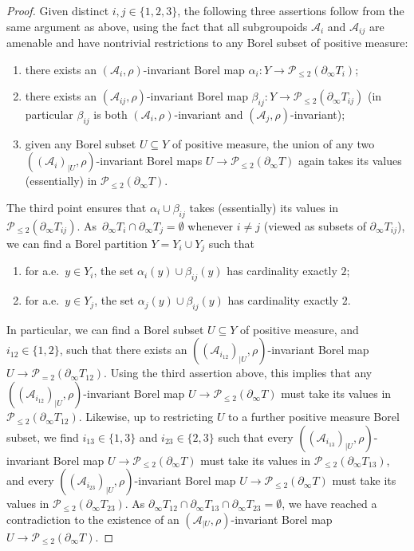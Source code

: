 \documentclass[11pt]{article}
\numberwithin{equation}{section}
\let\mathcal\mathscr
\theoremstyle{plain}
\theoremstyle{definition}
\newcommand{\cala}{\mathcal{A}}
\newcommand{\calp}{\mathcal{P}}
\begin{document}
\begin{proof}
Given distinct $i,j\in\{1,2,3\}$, the following three assertions follow from the same argument as above, using the fact that all subgroupoids $\cala_i$ and $\cala_{ij}$ are amenable and have nontrivial restrictions to any Borel subset of positive measure:
\begin{enumerate}
\item there exists an $(\cala_i,\rho)$-invariant Borel map $\alpha_i:Y\to\calp_{\le 2}(\partial_\infty T_i)$;
\item there exists an $(\cala_{ij},\rho)$-invariant Borel map $\beta_{ij}:Y\to\calp_{\le 2}(\partial_\infty T_{ij})$ (in particular $\beta_{ij}$ is both $(\cala_i,\rho)$-invariant and $(\cala_j,\rho)$-invariant);
\item given any Borel subset $U\subseteq Y$ of positive measure, the union of any two $((\cala_i)_{|U},\rho)$-invariant Borel maps $U\to\calp_{\le 2}(\partial_\infty T)$ again takes its values (essentially) in $\calp_{\le 2}(\partial_\infty T)$.
\end{enumerate}
The third point ensures that $\alpha_i\cup\beta_{ij}$ takes (essentially) its values in $\calp_{\le 2}(\partial_\infty T_{ij})$. As~$\partial_\infty T_i\cap\partial_\infty T_j=\emptyset$ whenever $i\neq j$ (viewed as subsets of $\partial_\infty T_{ij}$), we can find a Borel partition $Y=Y_i\cup Y_j$ such that
\begin{enumerate}
\item for a.e.\ $y\in Y_i$, the set $\alpha_i(y)\cup\beta_{ij}(y)$ has cardinality exactly $2$;
\item for a.e.\ $y\in Y_j$, the set $\alpha_j(y)\cup\beta_{ij}(y)$ has cardinality exactly $2$.
\end{enumerate}
In particular, we can find a Borel subset $U\!\subseteq\! Y$ of positive measure, and $i_{12}\!\in\!\{1,2\}$, such that there exists an $((\cala_{i_{12}})_{|U},\rho)$-invariant Borel map $U\to\calp_{=2}(\partial_\infty T_{12})$. Using the third assertion above, this implies that any $((\cala_{i_{12}})_{|U},\rho)$-invariant Borel map $U\to\calp_{\le 2}(\partial_\infty T)$ must take its values in $\calp_{\le 2}(\partial_\infty T_{12})$. Likewise, up to restricting $U$ to a further positive measure Borel subset, we find $i_{13}\in\{1,3\}$ and $i_{23}\in\{2,3\}$ such that every $((\cala_{i_{13}})_{|U},\rho)$-invariant Borel map $U\to\calp_{\le 2}(\partial_\infty T)$ must take its values in $\calp_{\le 2}(\partial_\infty T_{13})$, and every $((\cala_{i_{23}})_{|U},\rho)$-invariant Borel map $U\to\calp_{\le 2}(\partial_\infty T)$ must take its values in $\calp_{\le 2}(\partial_\infty T_{23})$. As $\partial_\infty T_{12}\cap\partial_\infty T_{13}\cap\partial_\infty T_{23}=\emptyset$, we have reached a contradiction to the existence of an $(\cala_{|U},\rho)$-invariant Borel map $U\to\calp_{\le 2}(\partial_\infty T)$.
\end{proof}
\end{document}
